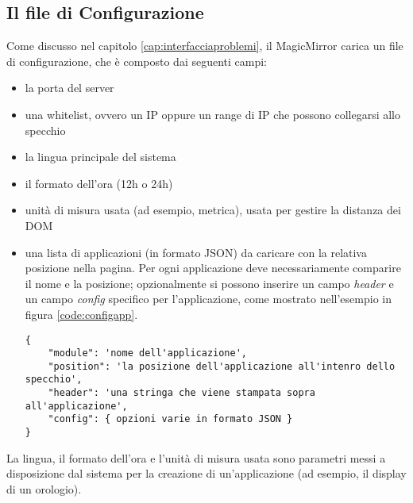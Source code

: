 \subsection{Il file di Configurazione}\label{cap:MMconf}
Come discusso nel capitolo \ref{cap:interfacciaproblemi}, il MagicMirror carica un file di configurazione, che \`e composto dai seguenti campi:
\begin{itemize}
\item la porta del server
\item una whitelist, ovvero un IP oppure un range di IP che possono collegarsi allo specchio
\item la lingua principale del sistema
\item il formato dell'ora (12h o 24h)
\item unit\`a di misura usata (ad esempio, metrica), usata per gestire la distanza dei DOM
\item una lista di applicazioni (in formato JSON) da caricare con la relativa posizione nella pagina. Per ogni applicazione deve necessariamente comparire il
nome e la posizione; opzionalmente si possono inserire un campo  \textit{header} e un campo \textit{config} specifico per l'applicazione, come mostrato
nell'esempio in figura \ref{code:configapp}.
\begin{lstlisting}[label={code:configapp}]
{
	"module": 'nome dell'applicazione',
	"position": 'la posizione dell'applicazione all'intenro dello specchio',
	"header": 'una stringa che viene stampata sopra all'applicazione',
	"config": { opzioni varie in formato JSON }
}
\end{lstlisting}
\end{itemize}
La lingua, il formato dell'ora e l'unit\`a di misura usata sono parametri messi a disposizione dal sistema per la creazione di un'applicazione
(ad esempio, il display di un orologio).

